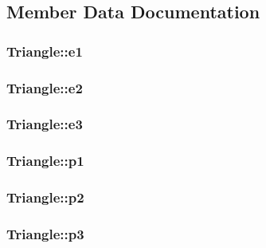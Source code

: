 \subsection{Member Data Documentation}
\subsubsection[{\texorpdfstring{e1}{e1}}]{ Triangle\+::e1}\hypertarget{class_triangle_ab91aa48d8a4c25deecd1a35433a38260}{}\label{class_triangle_ab91aa48d8a4c25deecd1a35433a38260}
\subsubsection[{\texorpdfstring{e2}{e2}}]{ Triangle\+::e2}\hypertarget{class_triangle_a5ad4339f6fb03adb4f6ee840ace34d82}{}\label{class_triangle_a5ad4339f6fb03adb4f6ee840ace34d82}
\subsubsection[{\texorpdfstring{e3}{e3}}]{ Triangle\+::e3}\hypertarget{class_triangle_aa55fc8f8662cba36b227858760bb173c}{}\label{class_triangle_aa55fc8f8662cba36b227858760bb173c}
\subsubsection[{\texorpdfstring{p1}{p1}}]{ Triangle\+::p1}\hypertarget{class_triangle_af2ff757f1bff3177e1a0e8c19664edbc}{}\label{class_triangle_af2ff757f1bff3177e1a0e8c19664edbc}
\subsubsection[{\texorpdfstring{p2}{p2}}]{ Triangle\+::p2}\hypertarget{class_triangle_a6a7d000238fb26c47181de1e7a502037}{}\label{class_triangle_a6a7d000238fb26c47181de1e7a502037}
\subsubsection[{\texorpdfstring{p3}{p3}}]{ Triangle\+::p3}\hypertarget{class_triangle_a43b6750934c84aff2f34b38d2f26d012}{}\label{class_triangle_a43b6750934c84aff2f34b38d2f26d012}
